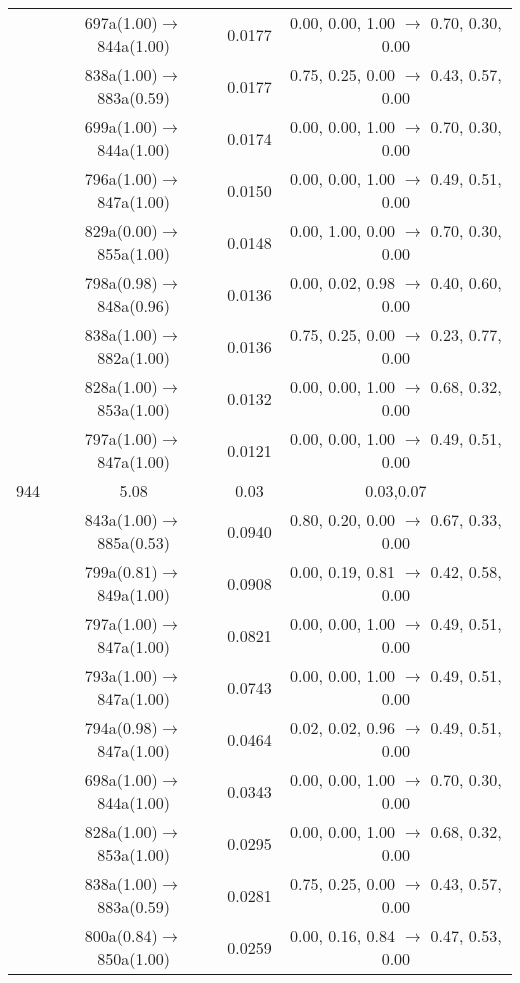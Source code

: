 \documentclass[10pt,a4paper]{article}
\begin{document}
\begin{longtable}{c|c|c|c}
 	& 697a(1.00)$\rightarrow$844a(1.00) &	 0.0177 &	 0.00, 0.00, 1.00 $\rightarrow$ 0.70, 0.30, 0.00 \\ 
 	& 838a(1.00)$\rightarrow$883a(0.59) &	 0.0177 &	 0.75, 0.25, 0.00 $\rightarrow$ 0.43, 0.57, 0.00 \\ 
 	& 699a(1.00)$\rightarrow$844a(1.00) &	 0.0174 &	 0.00, 0.00, 1.00 $\rightarrow$ 0.70, 0.30, 0.00 \\ 
 	& 796a(1.00)$\rightarrow$847a(1.00) &	 0.0150 &	 0.00, 0.00, 1.00 $\rightarrow$ 0.49, 0.51, 0.00 \\ 
 	& 829a(0.00)$\rightarrow$855a(1.00) &	 0.0148 &	 0.00, 1.00, 0.00 $\rightarrow$ 0.70, 0.30, 0.00 \\ 
 	& 798a(0.98)$\rightarrow$848a(0.96) &	 0.0136 &	 0.00, 0.02, 0.98 $\rightarrow$ 0.40, 0.60, 0.00 \\ 
 	& 838a(1.00)$\rightarrow$882a(1.00) &	 0.0136 &	 0.75, 0.25, 0.00 $\rightarrow$ 0.23, 0.77, 0.00 \\ 
 	& 828a(1.00)$\rightarrow$853a(1.00) &	 0.0132 &	 0.00, 0.00, 1.00 $\rightarrow$ 0.68, 0.32, 0.00 \\ 
 	& 797a(1.00)$\rightarrow$847a(1.00) &	 0.0121 &	 0.00, 0.00, 1.00 $\rightarrow$ 0.49, 0.51, 0.00 \\ 
 \hline944 &	 5.08 &	 0.03 &	 0.03,0.07 \\ 
  	& 843a(1.00)$\rightarrow$885a(0.53) &	 0.0940 &	 0.80, 0.20, 0.00 $\rightarrow$ 0.67, 0.33, 0.00 \\ 
 	& 799a(0.81)$\rightarrow$849a(1.00) &	 0.0908 &	 0.00, 0.19, 0.81 $\rightarrow$ 0.42, 0.58, 0.00 \\ 
 	& 797a(1.00)$\rightarrow$847a(1.00) &	 0.0821 &	 0.00, 0.00, 1.00 $\rightarrow$ 0.49, 0.51, 0.00 \\ 
 	& 793a(1.00)$\rightarrow$847a(1.00) &	 0.0743 &	 0.00, 0.00, 1.00 $\rightarrow$ 0.49, 0.51, 0.00 \\ 
 	& 794a(0.98)$\rightarrow$847a(1.00) &	 0.0464 &	 0.02, 0.02, 0.96 $\rightarrow$ 0.49, 0.51, 0.00 \\ 
 	& 698a(1.00)$\rightarrow$844a(1.00) &	 0.0343 &	 0.00, 0.00, 1.00 $\rightarrow$ 0.70, 0.30, 0.00 \\ 
 	& 828a(1.00)$\rightarrow$853a(1.00) &	 0.0295 &	 0.00, 0.00, 1.00 $\rightarrow$ 0.68, 0.32, 0.00 \\ 
 	& 838a(1.00)$\rightarrow$883a(0.59) &	 0.0281 &	 0.75, 0.25, 0.00 $\rightarrow$ 0.43, 0.57, 0.00 \\ 
 	& 800a(0.84)$\rightarrow$850a(1.00) &	 0.0259 &	 0.00, 0.16, 0.84 $\rightarrow$ 0.47, 0.53, 0.00 \\ 

\end{longtable}
\end{document}

